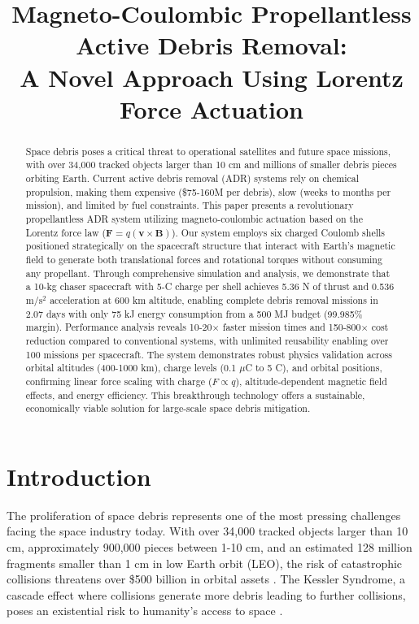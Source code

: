 \documentclass[12pt,a4paper]{article}
\title{\textbf{Magneto-Coulombic Propellantless Active Debris Removal: \\
A Novel Approach Using Lorentz Force Actuation}}
\author{}
\date{}
\begin{document}
\maketitle

\begin{abstract}
Space debris poses a critical threat to operational satellites and future space missions, with over 34,000 tracked objects larger than 10 cm and millions of smaller debris pieces orbiting Earth. Current active debris removal (ADR) systems rely on chemical propulsion, making them expensive (\$75-160M per debris), slow (weeks to months per mission), and limited by fuel constraints. This paper presents a revolutionary propellantless ADR system utilizing magneto-coulombic actuation based on the Lorentz force law ($\mathbf{F} = q(\mathbf{v} \times \mathbf{B})$). Our system employs six charged Coulomb shells positioned strategically on the spacecraft structure that interact with Earth's magnetic field to generate both translational forces and rotational torques without consuming any propellant. Through comprehensive simulation and analysis, we demonstrate that a 10-kg chaser spacecraft with 5-C charge per shell achieves 5.36 N of thrust and 0.536 m/s$^2$ acceleration at 600 km altitude, enabling complete debris removal missions in 2.07 days with only 75 kJ energy consumption from a 500 MJ budget (99.985\% margin). Performance analysis reveals 10-20$\times$ faster mission times and 150-800$\times$ cost reduction compared to conventional systems, with unlimited reusability enabling over 100 missions per spacecraft. The system demonstrates robust physics validation across orbital altitudes (400-1000 km), charge levels (0.1 $\mu$C to 5 C), and orbital positions, confirming linear force scaling with charge ($F \propto q$), altitude-dependent magnetic field effects, and energy efficiency. This breakthrough technology offers a sustainable, economically viable solution for large-scale space debris mitigation.
\end{abstract}

\section{Introduction}

The proliferation of space debris represents one of the most pressing challenges facing the space industry today. With over 34,000 tracked objects larger than 10 cm, approximately 900,000 pieces between 1-10 cm, and an estimated 128 million fragments smaller than 1 cm in low Earth orbit (LEO), the risk of catastrophic collisions threatens over \$500 billion in orbital assets \cite{kessler1978collision}. The Kessler Syndrome, a cascade effect where collisions generate more debris leading to further collisions, poses an existential risk to humanity's access to space \cite{liou2006risks}.
\end{document}
